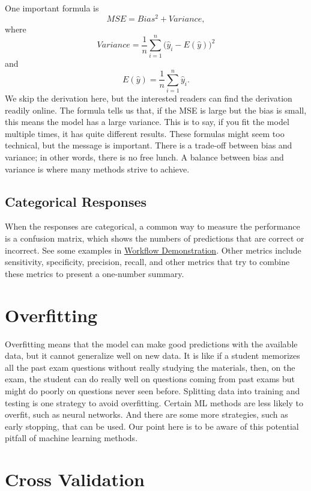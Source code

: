 \documentclass[
]{book}
\begin{document}
One important formula is
\[MSE = Bias^2 + Variance,\]
where
\[Variance = \frac{1}{n} \sum_{i=1}^n \bigg( \hat{y}_i - E(\hat{y}) \bigg)^2\]
and
\[E(\hat{y}) = \frac{1}{n} \sum_{i=1}^n \hat{y}_i.\]
We skip the derivation here, but the interested readers can find the derivation readily online. The formula tells us that, if the MSE is large but the bias is small, this means the model has a large variance. This is to say, if you fit the model multiple times, it has quite different results. These formulas might seem too technical, but the message is important. There is a trade-off between bias and variance; in other words, there is no free lunch. A balance between bias and variance is where many methods strive to achieve.

\hypertarget{categorical-responses}{%
\subsection{Categorical Responses}\label{categorical-responses}}

When the responses are categorical, a common way to measure the performance is a confusion matrix, which shows the numbers of predictions that are correct or incorrect. See some examples in \protect\hyperlink{workflow-demonstration}{Workflow Demonstration}. Other metrics include sensitivity, specificity, precision, recall, and other metrics that try to combine these metrics to present a one-number summary.

\hypertarget{overfitting}{%
\section{Overfitting}\label{overfitting}}

Overfitting means that the model can make good predictions with the available data, but it cannot generalize well on new data. It is like if a student memorizes all the past exam questions without really studying the materials, then, on the exam, the student can do really well on questions coming from past exams but might do poorly on questions never seen before. Splitting data into training and testing is one strategy to avoid overfitting. Certain ML methods are less likely to overfit, such as neural networks. And there are some more strategies, such as early stopping, that can be used. Our point here is to be aware of this potential pitfall of machine learning methods.

\hypertarget{cross-validation}{%
\section{Cross Validation}\label{cross-validation}}
\end{document}
